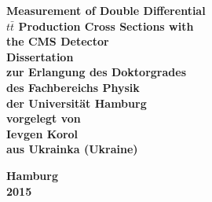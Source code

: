 \begin{titlepage}

\begin{center}

{ \huge \bfseries Measurement of Double Differential}\\[0.4cm]
{ \huge \bfseries $t\bar{t}$ Production Cross Sections with}\\[0.4cm]
{ \huge \bfseries the CMS Detector}\\[5.0cm]

{\LARGE \bfseries Dissertation}\\[0.4cm]
{\LARGE \bfseries zur Erlangung des Doktorgrades}\\[0.4cm]
{\LARGE \bfseries des Fachbereichs Physik}\\[0.4cm]
{\LARGE \bfseries der Universit\"at Hamburg}\\[5.0cm]

{\Large \bfseries vorgelegt von}\\[0.4cm]
{\Large \bfseries Ievgen Korol}\\[0.4cm]
{\Large \bfseries aus Ukrainka (Ukraine)}

\vfill

{\Large \bfseries Hamburg}\\[0.4cm]
{\Large \bfseries 2015}\\[0.4cm]

\end{center}

\end{titlepage}